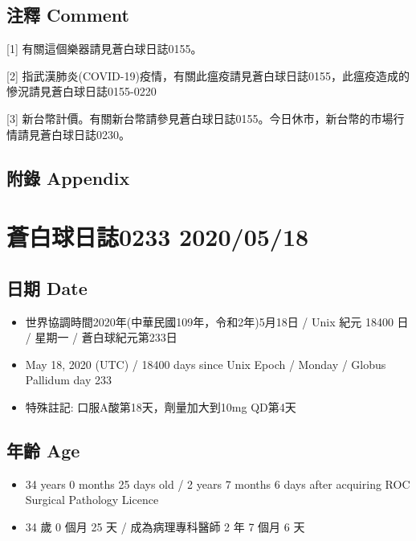 \documentclass[a5paper, 11pt
]{book}
\providecommand{\tightlist}{%
  \setlength{\itemsep}{0pt}\setlength{\parskip}{0pt}}
\begin{document}
\hypertarget{ux6ce8ux91cb-comment-77}{%
\subsection{注釋 Comment}\label{ux6ce8ux91cb-comment-77}}

{[}1{]} 有關這個樂器請見蒼白球日誌0155。

{[}2{]}
指武漢肺炎(COVID-19)疫情，有關此瘟疫請見蒼白球日誌0155，此瘟疫造成的慘況請見蒼白球日誌0155-0220

{[}3{]}
新台幣計價。有關新台幣請參見蒼白球日誌0155。今日休市，新台幣的市場行情請見蒼白球日誌0230。

\hypertarget{ux9644ux9304-appendix-77}{%
\subsection{附錄 Appendix}\label{ux9644ux9304-appendix-77}}

\hypertarget{ux84bcux767dux7403ux65e5ux8a8c0233-20200518}{%
\section{蒼白球日誌0233
2020/05/18}\label{ux84bcux767dux7403ux65e5ux8a8c0233-20200518}}

\hypertarget{ux65e5ux671f-date-78}{%
\subsection{日期 Date}\label{ux65e5ux671f-date-78}}

\begin{itemize}
\tightlist
\item
  世界協調時間2020年(中華民國109年，令和2年)5月18日 / Unix 紀元 18400 日
  / 星期一 / 蒼白球紀元第233日
\item
  May 18, 2020 (UTC) / 18400 days since Unix Epoch / Monday / Globus
  Pallidum day 233
\item
  特殊註記: 口服A酸第18天，劑量加大到10mg QD第4天
\end{itemize}

\hypertarget{ux5e74ux9f61-age-78}{%
\subsection{年齡 Age}\label{ux5e74ux9f61-age-78}}

\begin{itemize}
\tightlist
\item
  34 years 0 months 25 days old / 2 years 7 months 6 days after
  acquiring ROC Surgical Pathology Licence
\item
  34 歲 0 個月 25 天 / 成為病理專科醫師 2 年 7 個月 6 天
\end{itemize}
\end{document}
